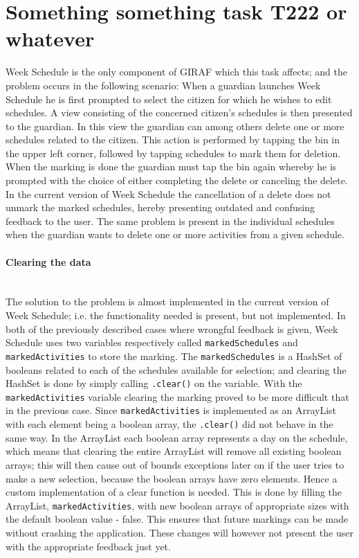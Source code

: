 \section{Something something task T222 or whatever}
Week Schedule is the only component of GIRAF which this task affects; and the problem occurs in the following scenario:
When a guardian launches Week Schedule he is first prompted to select the citizen for which he wishes to edit schedules.
A view consisting of the concerned citizen's schedules is then presented to the guardian.
In this view the guardian can among others delete one or more schedules related to the citizen.
This action is performed by tapping the bin in the upper left corner, followed by tapping schedules to mark them for deletion.
When the marking is done the guardian must tap the bin again whereby he is prompted with the choice of either completing the delete or canceling the delete.
In the current version of Week Schedule the cancellation of a delete does not unmark the marked schedules, hereby presenting outdated and confusing feedback to the user.
The same problem is present in the individual schedules when the guardian wants to delete one or more activities from a given schedule.

\paragraph{Clearing the data}\hfill\\
The solution to the problem is almost implemented in the current version of Week Schedule; i.e. the functionality needed is present, but not implemented.
In both of the previously described cases where wrongful feedback is given, Week Schedule uses two variables respectively called \texttt{markedSchedules} and \texttt{markedActivities} to store the marking.
The \texttt{markedSchedules} is a HashSet of booleans related to each of the schedules available for selection; and clearing the HashSet is done by simply calling \texttt{.clear()} on the variable.
With the \texttt{markedActivities} variable clearing the marking proved to be more difficult that in the previous case.
Since \texttt{markedActivities} is implemented as an ArrayList with each element being a boolean array, the \texttt{.clear()} did not behave in the same way.
In the ArrayList each boolean array represents a day on the schedule, which means that clearing the entire ArrayList will remove all existing boolean arrays; this will then cause out of bounds exceptions later on if the user tries to make a new selection, because the boolean arrays have zero elements. 
Hence a custom implementation of a clear function is needed.
This is done by filling the ArrayList, \texttt{markedActivities}, with new boolean arrays of appropriate sizes with the default boolean value - false.
This ensures that future markings can be made without crashing the application.
These changes will however not present the user with the appropriate feedback just yet.

